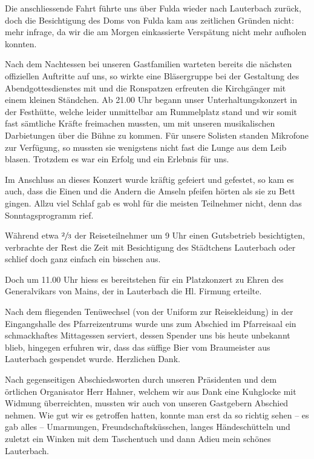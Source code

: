 \begin{history}
\begin{itemize}
              Die anschliessende Fahrt führte uns über Fulda wieder nach Lauterbach
              zurück, doch die Besichtigung des Doms von Fulda kam aus zeitlichen
              Gründen nicht: mehr infrage, da wir die am Morgen einkassierte
              Verspätung nicht mehr aufholen konnten.

              Nach dem Nachtessen bei unseren Gastfamilien warteten bereits die
              nächsten offiziellen Auftritte auf uns, so wirkte eine Bläsergruppe bei
              der Gestaltung des Abendgottesdienstes mit und die Ronspatzen erfreuten
              die Kirchgänger mit einem kleinen Ständchen. Ab 21.00 Uhr begann unser
              Unterhaltungskonzert in der Festhütte, welche leider unmittelbar am
              Rummelplatz stand und wir somit fast sämtliche Kräfte freimachen
              mussten, um mit unseren musikalischen Darbietungen über die Bühne zu
              kommen. Für unsere Solisten standen Mikrofone zur Verfügung, so mussten
              sie wenigstens nicht fast die Lunge aus dem Leib blasen. Trotzdem es war
              ein Erfolg und ein Erlebnis für uns.

              Im Anschluss an dieses Konzert wurde kräftig gefeiert und gefestet, so
              kam es auch, dass die Einen und die Andern die Amseln pfeifen hörten als
              sie zu Bett gingen. Allzu viel Schlaf gab es wohl für die meisten
              Teilnehmer nicht, denn das Sonntagsprogramm rief.

              Während etwa $\sfrac{2}{3}$ der Reiseteilnehmer um 9 Uhr einen
              Gutsbetrieb besichtigten, verbrachte der Rest die Zeit mit Besichtigung
              des Städtchens Lauterbach oder schlief doch ganz einfach ein bisschen
              aus.

              Doch um 11.00 Uhr hiess es bereitstehen für ein Platzkonzert zu Ehren
              des Generalvikars von Mains, der in Lauterbach die Hl. Firmung erteilte.

              Nach dem fliegenden Tenüwechsel (von der Uniform zur Reisekleidung) in
              der Eingangshalle des Pfarreizentrums wurde uns zum Abschied im
              Pfarreisaal ein schmackhaftes Mittagessen serviert, dessen Spender uns
              bis heute unbekannt blieb, hingegen erfuhren wir, dass das süffige Bier
              vom Braumeister aus Lauterbach gespendet wurde. Herzlichen Dank.

              Nach gegenseitigen Abschiedsworten durch unseren Präsidenten und dem
              örtlichen Organisator Herr Hahner, welchem wir aus Dank eine Kuhglocke
              mit Widmung überreichten, mussten wir auch von unseren Gastgebern
              Abschied nehmen. Wie gut wir es getroffen hatten, konnte man erst da so
              richtig sehen -- es gab alles -- Umarmungen, Freundschaftsküsschen,
              langes Händeschütteln und zuletzt ein Winken mit dem Taschentuch und
              dann Adieu mein schönes Lauterbach.


\end{itemize}
\end{history}
